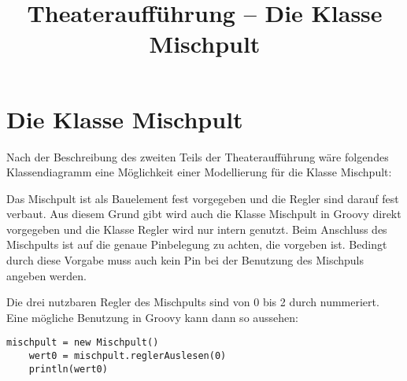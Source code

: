 \documentclass[11pt,a4paper,parskip=half]{scrartcl}
\title{Theateraufführung -- Die Klasse Mischpult}
\begin{document}
\section*{Die Klasse Mischpult}

Nach der Beschreibung des zweiten Teils der Theateraufführung wäre folgendes Klassendiagramm eine Möglichkeit einer Modellierung für die Klasse Mischpult:

\begin{figure}[ht]
    \centering
\end{figure}

Das Mischpult ist als Bauelement fest vorgegeben und die Regler sind darauf fest verbaut. Aus diesem Grund gibt wird auch die Klasse Mischpult in Groovy direkt vorgegeben und die Klasse Regler wird nur intern genutzt. Beim Anschluss des Mischpults ist auf die genaue Pinbelegung zu achten, die vorgeben ist. Bedingt durch diese Vorgabe muss auch kein Pin bei der Benutzung des Mischpuls angeben werden.

Die drei nutzbaren Regler des Mischpults sind von 0 bis 2 durch nummeriert. Eine mögliche Benutzung in Groovy kann dann so aussehen:

\begin{lstlisting}[gobble=2]
    mischpult = new Mischpult()
    wert0 = mischpult.reglerAuslesen(0)
    println(wert0)
\end{lstlisting}
\end{document}
